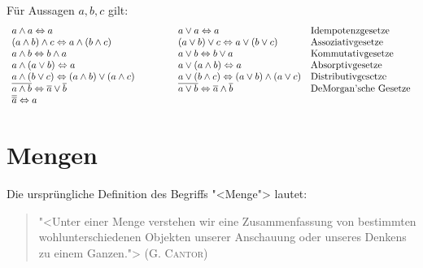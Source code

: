 \begin{lemma}\label{rechenregeln}Für Aussagen $a,b,c$ gilt:
%
\[\begin{array}{llll}
a \wedge a \Leftrightarrow a & \hspace{2.5em} & a \vee a \Leftrightarrow a &\textrm{Idempotenzgesetze}\index{Idempotenzgesetz}\\
(a \wedge b) \wedge c \Leftrightarrow a \wedge (b \wedge c) & & (a \vee b) \vee
c \Leftrightarrow a \vee (b \vee c) &\textrm{Assoziativgesetze}\index{Assoziativgesetz}\\
a \wedge b \Leftrightarrow b \wedge a & & a \vee b \Leftrightarrow b \vee a &\textrm{Kommutativgesetze}\index{Kommutativgesetz}\\
a \wedge (a \vee b) \Leftrightarrow a & & a \vee (a \wedge b) \Leftrightarrow a &\textrm{Absorptivgesetze}\index{Absorptivgesetz}\\
a \wedge (b \vee c) \Leftrightarrow (a \wedge b) \vee (a \wedge c)
     & & a \vee (b \wedge c) \Leftrightarrow (a \vee b) \wedge (a \vee c) &\textrm{Distributivgesetze}\index{Distributivgesetz}\\
\overline{a \wedge b} \Leftrightarrow \overline{a} \vee \overline{b} & 
       & \overline{a \vee b} \Leftrightarrow \overline{a} \wedge \overline{b}
       &\textrm{DeMorgan'sche Gesetze\index{DeMorgan'sches Gesetz}}\\
       \overline{\overline a} \Leftrightarrow a
\end{array}\]
\end{lemma}

\section{Mengen}

Die ursprüngliche Definition des Begriffs "<Menge">
lautet: 


\begin{quote}
"<Unter einer Menge verstehen wir eine Zusammenfassung von bestimmten
wohlunterschiedenen Objekten unserer Anschauung oder unseres Denkens zu
einem Ganzen."> \textsc{(G. Cantor)}
\end{quote}

